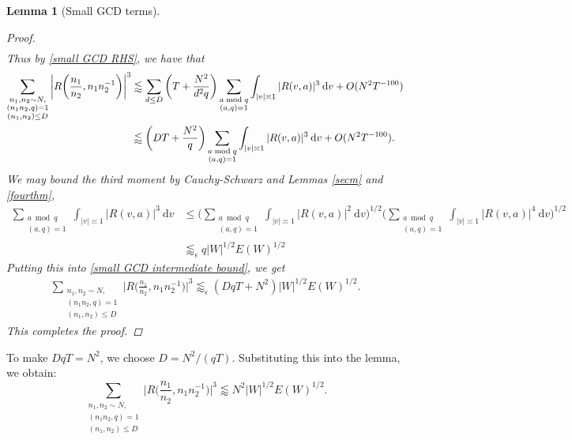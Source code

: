 \documentclass[12pt]{amsart}
\newtheorem{lemma}[theorem]{Lemma}
\theoremstyle{definition}
\theoremstyle{plain}
\theoremstyle{remark}
\numberwithin{equation}{section}
\numberwithin{theorem}{section}
\numberwithin{equation}{section}
\begin{document}
\begin{lemma}[Small GCD terms]
\begin{proof}
\begin{align*}
			\end{align*}
			Thus by \eqref{small GCD RHS}, we have that 
			\begin{align}
				\sum_{\substack{n_{1}, n_{2} \sim N, \\ (n_{1}n_{2}, q)=1  \\ (n_{1}, n_{2}) \leq D}}\bigg|R\bigg(\frac{n_{1}}{n_{2}}, n_{1}n_{2}^{-1}\bigg)\bigg|^{3}&\lessapprox\sum_{d \leq D}\bigg(T+\frac{N^{2}}{d^{2}q}\bigg)\sum_{\substack{a \bmod q \\ (a, q)=1}}\int_{|v|\asymp 1}|R(v, a)|^{3}
				\:\mathrm{d}v+O(N^{2}T^{-100}) \notag \\
				&\lessapprox \bigg(DT+ \frac{N^2}{q}\bigg) \sum_{\substack{a \bmod q \\ (a, q)=1}}\int_{|v|\asymp 1}|R(v, a)|^{3}
				\:\mathrm{d}v + O(N^2T^{-100}). \label{small GCD intermediate bound}
			\end{align}
			We may bound the third moment by Cauchy-Schwarz and Lemmas \ref{secm} and \ref{fourthm},
			\begin{align*}
				\sum_{\substack{a \bmod q \\ (a, q)=1}}\int_{|v|\asymp 1}|R(v, a)|^{3}
				\:\mathrm{d}v &\leq \bigg(\sum_{\substack{a \bmod q \\ (a, q)=1}}\int_{|v|\asymp 1}|R(v, a)|^{2}
				\:\mathrm{d}v\bigg)^{1/2}
				\bigg(\sum_{\substack{a \bmod q \\ (a, q)=1}}\int_{|v|\asymp 1}|R(v, a)|^{4}
				\:\mathrm{d}v\bigg)^{1/2} \\
				&\lessapprox_{\epsilon} q|W|^{1/2}E(W)^{1/2}
			\end{align*}
			Putting this into \eqref{small GCD intermediate bound}, we get
			\begin{align*}
				\sum_{\substack{n_{1}, n_{2} \sim N, \\ (n_{1}n_{2}, q)=1  \\ (n_{1}, n_{2}) \leq D}}\bigg|R\bigg(\frac{n_{1}}{n_{2}}, n_{1}n_{2}^{-1}\bigg)\bigg|^{3}\lessapprox_{\epsilon}(DqT+N^{2})|W|^{1/2}E(W)^{1/2}.
			\end{align*}
			This completes the proof.
		\end{proof}	
	\end{lemma}
	To make $DqT=N^{2}$, we choose $D=N^{2}/(qT)$.  Substituting this into the lemma, we obtain: 
	\begin{equation}\label{sgcdb}
		\sum_{\substack{n_{1}, n_{2} \sim N, \\ (n_{1}n_{2}, q)=1  \\ (n_{1}, n_{2}) \leq D}}\bigg|R\bigg(\frac{n_{1}}{n_{2}}, n_{1}n_{2}^{-1}\bigg)\bigg|^{3} \lessapprox N^{2}|W|^{1/2}E(W)^{1/2}.
	\end{equation}
	
\end{document}
